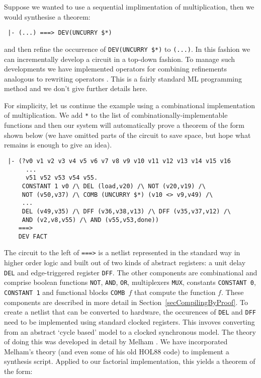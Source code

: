 Suppose we wanted to use a sequential implimentation of multiplication,
then we would synthesise a theorem:

\vspace*{-2mm}

{\baselineskip10pt\begin{verbatim}
 |- (...) ===> DEV(UNCURRY $*)
\end{verbatim}}

\vspace*{-2mm}

\noindent and then refine the occurrence of \texttt{DEV(UNCURRY~\$*)}
to \texttt{(...)}.  In this fashion we can incrementally develop a
circuit in a top-down fashion. To manage such developments we have
implemented operators for combining refinements analogous to rewriting
operators \cite{Paulson}. This is a fairly standard ML programming
method and we don't give further details here.

For simplicity, let us continue the example using a combinational
implementation of multiplication. We add \texttt{*} to the list of
combinationally-implementable functions and then our system will
automatically prove a theorem of the form shown below (we have omitted
parts of the circuit to save space, but hope what remains is enough to
give an idea).

\vspace*{-2mm}

{\baselineskip10pt\begin{verbatim}
 |- (?v0 v1 v2 v3 v4 v5 v6 v7 v8 v9 v10 v11 v12 v13 v14 v15 v16
      ...
      v51 v52 v53 v54 v55.
     CONSTANT 1 v0 /\ DEL (load,v20) /\ NOT (v20,v19) /\
     NOT (v50,v37) /\ COMB (UNCURRY $*) (v10 <> v9,v49) /\
     ...
     DEL (v49,v35) /\ DFF (v36,v38,v13) /\ DFF (v35,v37,v12) /\
     AND (v2,v8,v55) /\ AND (v55,v53,done)) 
    ===> 
    DEV FACT
\end{verbatim}}

\vspace*{-2mm}

The circuit to the left of \texttt{===>} is a netlist represented in
the standard way in higher order logic \cite{Mel93} and built out of
two kinds of abstract registers: a unit delay \texttt{DEL} and
edge-triggered register \texttt{DFF}. The other components are
combinational and comprise boolean functions \texttt{NOT},
\texttt{AND}, \texttt{OR}, multiplexers \texttt{MUX}, constants
\texttt{CONSTANT~0}, \texttt{CONSTANT~1} and functional blocks
\texttt{COMB~$f$} that compute the function $f$. These components are
described in more detail in Section~\ref{secCompilingByProof}. To
create a netlist that can be converted to hardware, the occurences of
\texttt{DEL} and \texttt{DFF} need to be implemented using standard
clocked registers. This invoves converting from an abstract `cycle
based' model to a clocked synchronous model. The theory of doing this
was developed in detail by Melham \cite{Mel93}. We have incorporated
Melham's theory (and even some of his old HOL88 code) to
implement a synthesis script. Applied to our factorial implementation, this yields
a theorem of the form:

